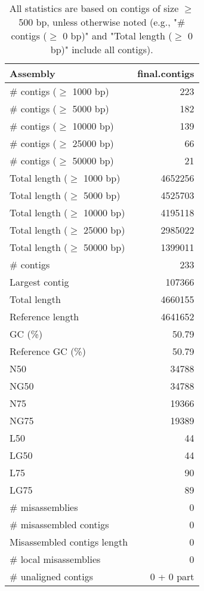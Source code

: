 \documentclass[12pt,a4paper]{article}
\begin{document}
\begin{table}[ht]
\begin{center}
\caption{All statistics are based on contigs of size $\geq$ 500 bp, unless otherwise noted (e.g., "\# contigs ($\geq$ 0 bp)" and "Total length ($\geq$ 0 bp)" include all contigs).}
\begin{tabular}{|l*{1}{|r}|}
\hline
Assembly & final.contigs \\ \hline
\# contigs ($\geq$ 1000 bp) & 223 \\ \hline
\# contigs ($\geq$ 5000 bp) & 182 \\ \hline
\# contigs ($\geq$ 10000 bp) & 139 \\ \hline
\# contigs ($\geq$ 25000 bp) & 66 \\ \hline
\# contigs ($\geq$ 50000 bp) & 21 \\ \hline
Total length ($\geq$ 1000 bp) & 4652256 \\ \hline
Total length ($\geq$ 5000 bp) & 4525703 \\ \hline
Total length ($\geq$ 10000 bp) & 4195118 \\ \hline
Total length ($\geq$ 25000 bp) & 2985022 \\ \hline
Total length ($\geq$ 50000 bp) & 1399011 \\ \hline
\# contigs & 233 \\ \hline
Largest contig & 107366 \\ \hline
Total length & 4660155 \\ \hline
Reference length & 4641652 \\ \hline
GC (\%) & 50.79 \\ \hline
Reference GC (\%) & 50.79 \\ \hline
N50 & 34788 \\ \hline
NG50 & 34788 \\ \hline
N75 & 19366 \\ \hline
NG75 & 19389 \\ \hline
L50 & 44 \\ \hline
LG50 & 44 \\ \hline
L75 & 90 \\ \hline
LG75 & 89 \\ \hline
\# misassemblies & 0 \\ \hline
\# misassembled contigs & 0 \\ \hline
Misassembled contigs length & 0 \\ \hline
\# local misassemblies & 0 \\ \hline
\# unaligned contigs & 0 + 0 part \\ \hline

\end{tabular}
\end{center}
\end{table}
\end{document}
